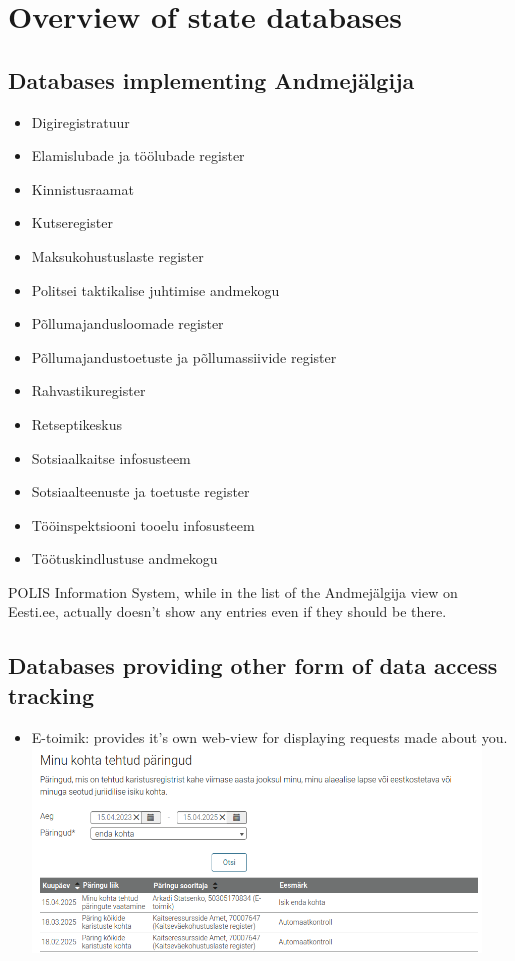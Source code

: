 \section{Overview of state databases} \label{Overview of state databases}

\subsection{Databases implementing Andmejälgija}

\begin{itemize}
    \item{Digiregistratuur}
    \item{Elamislubade ja töölubade register}
    \item{Kinnistusraamat}
    \item{Kutseregister}
    \item{Maksukohustuslaste register}
    
    \item{Politsei taktikalise juhtimise andmekogu}
    \item{Põllumajandusloomade register}
    \item{Põllumajandustoetuste ja põllumassiivide register}
    \item{Rahvastikuregister}
    \item{Retseptikeskus}
    \item{Sotsiaalkaitse infosusteem}
    \item{Sotsiaalteenuste ja toetuste register}
    \item{Tööinspektsiooni tooelu infosusteem}
    \item{Töötuskindlustuse andmekogu}
\end{itemize}
POLIS Information System, while in the list of the Andmejälgija view on Eesti.ee, actually doesn't show any entries even if they should be there.

\subsection{Databases providing other form of data access tracking}
\begin{itemize}
    \item{E-toimik}: provides it's own web-view for displaying requests made about you.
    \includegraphics[width=450px]{english/figures/e-toimik.png}
\end{itemize}




